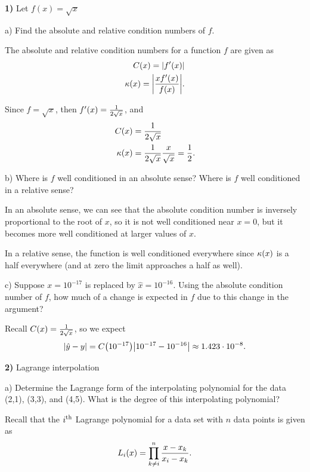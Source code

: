 \documentclass[12pt,a4paper]{article}
\newcommand{\prob}[2]{\textbf{#1)} #2}
\begin{document}
\prob{1}{Let $f(x) = \sqrt{x}$}

a) Find the absolute and relative condition numbers of $f$.

The absolute and relative condition numbers for a function $f$ are given as
\begin{align*}
    C\qty(x) = \abs{f'\qty(x) } \\
    \kappa\qty(x) = \abs{\frac{xf'\qty(x)}{f\qty(x) }} 
.\end{align*}

Since 
    $f = \sqrt{x}$, 
then 
    $f'\qty(x) = \frac{1}{2 \sqrt{x}}$,
and
\begin{align*}
    C\qty(x) &= \frac{1}{2\sqrt{x}} \\
    \kappa\qty(x) &= \frac{1}{2\sqrt{x}}\frac{x}{\sqrt{x}} = \frac{1}{2}
.\end{align*}

b) Where is $f$ well conditioned in an absolute sense? Where is $f$ well conditioned in a relative sense?

In an absolute sense, we can see that the absolute condition number is inversely proportional to the root of $x$, so it is not well conditioned near $x = 0$, but it becomes more well conditioned at larger values of $x$.

In a relative sense, the function is well conditioned everywhere since $\kappa\qty(x)$ is a half everywhere (and at zero the limit approaches a half as well).

c) Suppose $x = 10^{-17}$ is replaced by $\hat{x} = 10^{-16}$. Using the absolute condition number of $f$, how much of a change is expected in $f$ due to this change in the argument?

Recall $C\qty(x) = \frac{1}{2\sqrt{x}}$, so we expect
\begin{align*}
    \abs{\hat{y} - y} = C\qty(10^{-17})\abs{10^{-17} - 10^{-16}} \approx 1.423 \cdot 10^{-8}
.\end{align*}

\prob{2}{Lagrange interpolation}

a) Determine the Lagrange form of the interpolating polynomial for the data (2,1), (3,3), and (4,5).
What is the degree of this interpolating polynomial?

Recall that the $i^{\rm th}$ Lagrange polynomial for a data set with $n$ data points is given as
\begin{align*}
    L_i\qty(x) = \prod_{k \ne i}^{n} \frac{x-x_k}{x_i-x_k}
.\end{align*}
\end{document}
